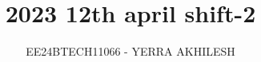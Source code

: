 \documentclass[journal]{IEEEtran}
\begin{document}

\vspace{3cm}

\title{2023 12th april shift-2}
\author{EE24BTECH11066 - YERRA AKHILESH
}
{\let\newpage\relax\maketitle}

\renewcommand{\thefigure}{\theenumi}
\renewcommand{\thetable}{\theenumi}
\setlength{\intextsep}{10pt} %


\renewcommand{\thetable}{\theenumi}
\end{document}
